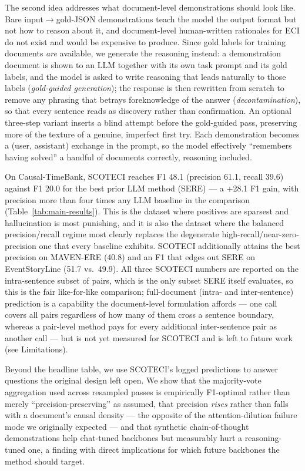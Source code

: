 \documentclass[11pt]{article}
\newcommand{\method}{SCOTECI}
\begin{document}
The second idea addresses what document-level demonstrations should look like. Bare
input$\to$gold-JSON demonstrations teach the model the output format but not how to
reason about it, and document-level human-written rationales for ECI do not exist
and would be expensive to produce. Since gold labels for training documents
\emph{are} available, we generate the reasoning instead: a demonstration document is
shown to an LLM together with its own task prompt and its gold labels, and the model
is asked to write reasoning that leads naturally to those labels (\emph{gold-guided
generation}); the response is then rewritten from scratch to remove any phrasing that
betrays foreknowledge of the answer (\emph{decontamination}), so that every sentence
reads as discovery rather than confirmation. An optional three-step variant inserts a
blind attempt before the gold-guided pass, preserving more of the texture of a
genuine, imperfect first try. Each demonstration becomes a (user, assistant) exchange
in the prompt, so the model effectively ``remembers having solved'' a handful of
documents correctly, reasoning included.

On Causal-TimeBank, \method{} reaches F1 48.1 (precision 61.1, recall 39.6) against
F1 20.0 for the best prior LLM method (SERE) --- a +28.1 F1 gain, with precision more
than four times any LLM baseline in the comparison (Table~\ref{tab:main-results}).
This is the dataset where positives are sparsest and hallucination is most punishing,
and it is also the dataset where the balanced precision/recall regime most clearly
replaces the degenerate high-recall/near-zero-precision one that every baseline
exhibits. \method{} additionally attains the best precision on MAVEN-ERE (40.8) and
an F1 that edges out SERE on EventStoryLine (51.7 vs.\ 49.9). All three \method{}
numbers are reported on the intra-sentence subset of pairs, which is the only subset
SERE itself evaluates, so this is the fair like-for-like comparison; full-document
(intra- and inter-sentence) prediction is a capability the document-level
formulation affords --- one call covers all pairs regardless of how many of them
cross a sentence boundary, whereas a pair-level method pays for every additional
inter-sentence pair as another call --- but is not yet measured for \method{} and is
left to future work (see Limitations).

Beyond the headline table, we use \method{}'s logged predictions to answer questions
the original design left open. We show that the majority-vote aggregation used
across resampled passes is empirically F1-optimal rather than merely
``precision-preserving'' as assumed, that precision \emph{rises} rather than falls
with a document's causal density --- the opposite of the attention-dilution failure
mode we originally expected --- and that synthetic chain-of-thought demonstrations
help chat-tuned backbones but measurably hurt a reasoning-tuned one, a finding with
direct implications for which future backbones the method should target.
\end{document}
